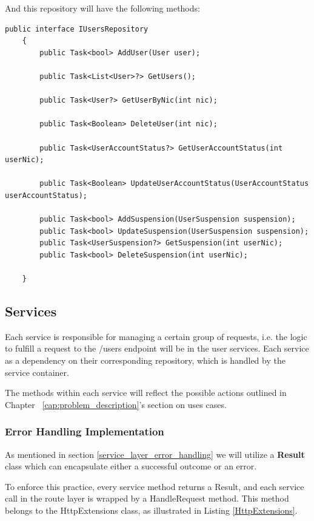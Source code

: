 And this repository will have the following methods:
\begin{lstlisting}[style=sharpc]
	public interface IUsersRepository
	{
		public Task<bool> AddUser(User user);
		
		public Task<List<User>?> GetUsers();
		
		public Task<User?> GetUserByNic(int nic);
		
		public Task<Boolean> DeleteUser(int nic);
		
		public Task<UserAccountStatus?> GetUserAccountStatus(int userNic);
		
		public Task<Boolean> UpdateUserAccountStatus(UserAccountStatus userAccountStatus);
		
		public Task<bool> AddSuspension(UserSuspension suspension);
		public Task<bool> UpdateSuspension(UserSuspension suspension);
		public Task<UserSuspension?> GetSuspension(int userNic);
		public Task<bool> DeleteSuspension(int userNic);
		
	}
\end{lstlisting}

\newpage

\subsection{Services}
Each service is responsible for managing a certain group of requests, i.e. the logic to fulfill a request to the /users endpoint will be in the user services. Each service as a dependency on their corresponding repository, which is handled by the service container.

The methods within each service will reflect the possible actions outlined in Chapter ~\ref{cap:problem_description}'s section on uses cases.

\subsubsection{Error Handling Implementation}
As mentioned in section \ref{service_layer_error_handling} we will utilize a \textbf{Result} class which can encapsulate either a successful outcome or an error.

To enforce this practice, every service method returns a Result, and each service call in the route layer is wrapped by a HandleRequest method. This method belongs to the HttpExtensions class, as illustrated in Listing \ref{HttpExtensions}.

